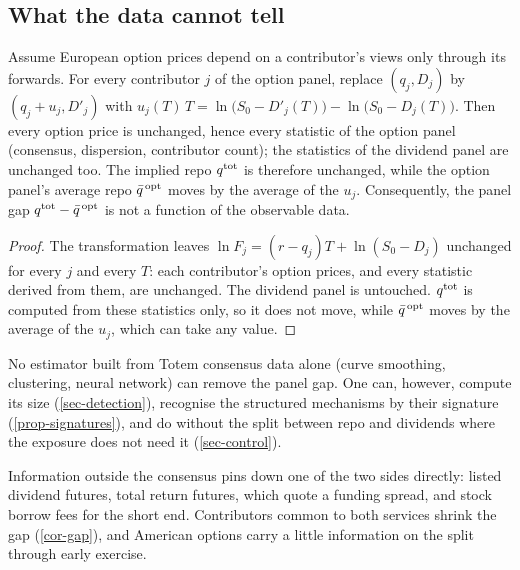 \subsection{What the data cannot tell}\label{sec-nonid}
\begin{theorem}\label{thm-nonid}
Assume European option prices depend on a contributor's views only through its forwards. For every contributor $j$
of the option panel, replace $(q_j, D_j)$ by $(q_j+u_j, D'_j)$ with
$u_j(T)\,T=\ln\bigl(S_0-D'_j(T)\bigr)-\ln\bigl(S_0-D_j(T)\bigr)$. Then every option price is unchanged, hence every
statistic of the option panel (consensus, dispersion, contributor count); the statistics of the dividend panel are
unchanged too. The implied repo $q^{\mathrm{tot}}$ is therefore unchanged, while the option panel's average repo $\bar q^{\,\mathrm{opt}}$ moves
by the average of the $u_j$. Consequently, the panel gap $q^{\mathrm{tot}}-\bar q^{\,\mathrm{opt}}$ is not a function of the observable data.
\end{theorem}
\begin{proof}
The transformation leaves $\ln F_j=(r-q_j)T+\ln(S_0-D_j)$ unchanged for every $j$ and every $T$: each contributor's
option prices, and every statistic derived from them, are unchanged. The dividend panel is untouched. $q^{\mathrm{tot}}$ is
computed from these statistics only, so it does not move, while $\bar q^{\,\mathrm{opt}}$ moves by the average of the $u_j$, which can
take any value.
\end{proof}

\begin{corollary}\label{cor-nonid}
No estimator built from Totem consensus data alone (curve smoothing, clustering, neural network) can remove the panel
gap. One can, however, compute its size (\cref{sec-detection}), recognise the structured mechanisms by their signature
(\cref{prop-signatures}), and do without the split between repo and dividends where the exposure does not need it
(\cref{sec-control}).
\end{corollary}

\begin{remark}
Information outside the consensus pins down one of the two sides directly: listed dividend futures, total return
futures, which quote a funding spread, and stock borrow fees for the short end. Contributors common to both services
shrink the gap (\cref{cor-gap}), and American options carry a little information on the split through early exercise.
\end{remark}

